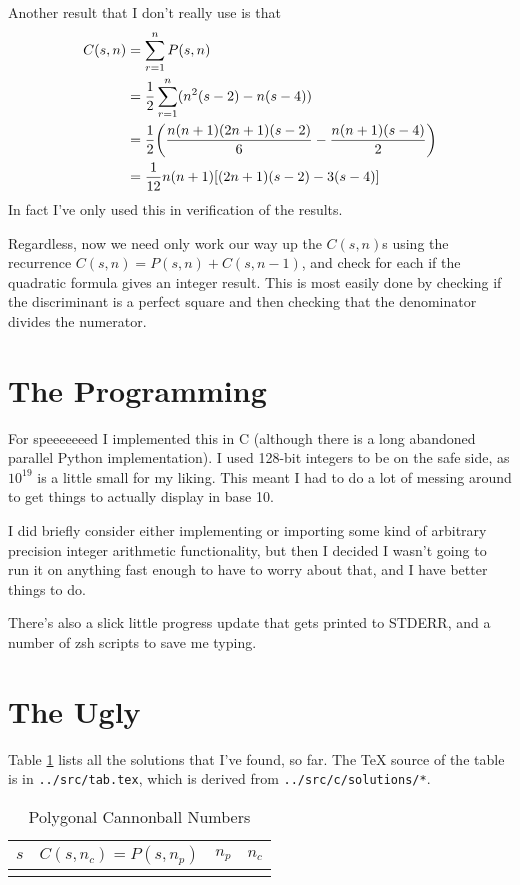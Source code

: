 \documentclass[fleqn,a4paper,11pt]{article}
\begin{document}
Another result that I don't really use is that
\begin{align*}
C(s, n) &= \sum_{r = 1}^n P(s, n) \\
    &= \frac 12 \sum_{r = 1}^n (n^2(s - 2) - n(s - 4)) \\
    &= \frac 12 \pqty{\frac{n(n + 1)(2n + 1)(s - 2)} 6
                    - \frac{n(n + 1)(s - 4)} 2} \\
    &= \frac 1{12}n(n + 1)\bqty{(2n + 1)(s - 2) - 3(s - 4)}
\end{align*}
In fact I've only used this in verification of the results.

Regardless, now we need only work our way up the \(C(s, n)\)s using the
recurrence \(C(s, n) = P(s, n) + C(s, n - 1)\), and check for each if the
quadratic formula gives an integer result. This is most easily done by checking
if the discriminant is a perfect square and then checking that the denominator
divides the numerator.

\section{The Programming}

For speeeeeeed I implemented this in C (although there is a long abandoned
parallel Python implementation). I used 128-bit integers to be on the safe side,
as \(10^{19}\) is a little small for my liking. This meant I had to do a lot of
messing around to get things to actually display in base 10.

I did briefly consider either implementing or importing some kind of arbitrary
precision integer arithmetic functionality, but then I decided I wasn't going to
run it on anything fast enough to have to worry about that, and I have better
things to do.

There's also a slick little progress update that gets printed to STDERR, and a
number of zsh scripts to save me typing.

\section{The Ugly}

Table \ref{tab_ugly} lists all the solutions that I've found, so far. The \TeX
source of the table is in \texttt{../src/tab.tex}, which is derived from
\texttt{../src/c/solutions/*}.

\begin{longtable}{*4r}
\toprule
\boldmath \(s\) & \boldmath \(C(s, n_c) = P(s, n_p)\)
& \boldmath \(n_p\) & \boldmath \(n_c\) \\
\midrule
\endhead

\bottomrule
\caption{Polygonal Cannonball Numbers}
\label{tab_ugly}
\end{longtable}
\end{document}
